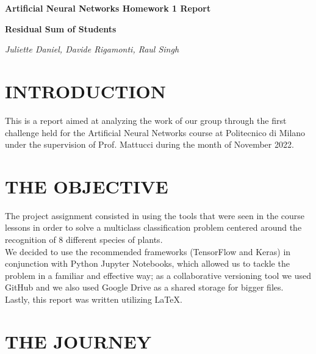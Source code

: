 \documentclass[11pt]{report}
\begin{document}
\begin{titlepage}
    \centering
    {\Large\bfseries Artificial Neural Networks Homework 1 Report \par}
    \vspace{-0.5em}
    {\normalsize\bfseries Residual Sum of Students \par}
    \vspace{-0.5em}
    {\normalsize\textit{Juliette Daniel, Davide Rigamonti, Raul Singh} \par}
\end{titlepage}

\section{INTRODUCTION}
This is a report aimed at analyzing the work of our group through the first challenge held for the Artificial Neural Networks course at Politecnico di Milano under the supervision of Prof. Mattucci during the month of November 2022.

\section{THE OBJECTIVE}
The project assignment consisted in using the tools that were seen in the course lessons in order to solve a multiclass classification problem centered around the recognition of 8 different species of plants. \\
We decided to use the recommended frameworks (TensorFlow and Keras) in conjunction with Python Jupyter Notebooks, which allowed us to tackle the problem in a familiar and effective way; as a collaborative versioning tool we used GitHub and we also used Google Drive as a shared storage for bigger files. \\
Lastly, this report was written utilizing {\selectfont \LaTeX}.

\section{THE JOURNEY}
\end{document}
